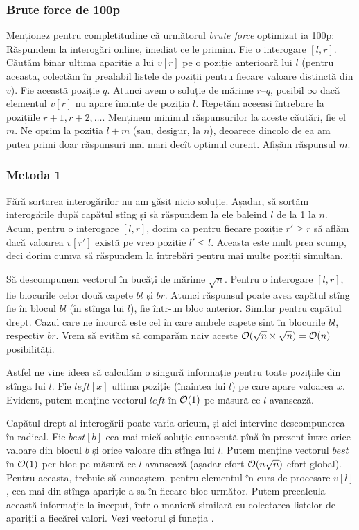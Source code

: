 \documentclass[../main.tex]{subfiles}
\begin{document}
\subsubsection*{Brute force de 100p}

Menționez pentru completitudine că următorul \textit{brute force} optimizat ia 100p: Răspundem la interogări online, imediat ce le primim. Fie o interogare $[l,r]$. Căutăm binar ultima apariție a lui $v[r]$ pe o poziție anterioară lui $l$ (pentru aceasta, colectăm în prealabil listele de poziții pentru fiecare valoare distinctă din $v$). Fie această poziție $q$. Atunci avem o soluție de mărime $r–q$, posibil $\infty$ dacă elementul $v[r]$ nu apare înainte de poziția $l$. Repetăm aceeași întrebare la pozițiile $r+1, r+2, \dots$. Menținem minimul răspunsurilor la aceste căutări, fie el $m$. Ne oprim la poziția $l+m$ (sau, desigur, la $n$), deoarece dincolo de ea am putea primi doar răspunsuri mai mari decît optimul curent. Afișăm răspunsul $m$.

\subsubsection*{Metoda 1}

Fără sortarea interogărilor nu am găsit nicio soluție. Așadar, să sortăm interogările după capătul stîng și să răspundem la ele baleind $l$ de la 1 la $n$. Acum, pentru o interogare $[l,r]$, dorim ca pentru fiecare poziție $r' \geq r$ să aflăm dacă valoarea $v[r']$ există pe vreo poziție $l' \leq l$. Aceasta este mult prea scump, deci dorim cumva să răspundem la întrebări pentru mai multe poziții simultan.

Să descompunem vectorul în bucăți de mărime $\sqrt{n}$. Pentru o interogare $[l,r]$, fie blocurile celor două capete $bl$ și $br$. Atunci răspunsul poate avea capătul stîng fie în blocul $bl$ (în stînga lui $l$), fie într-un bloc anterior. Similar pentru capătul drept. Cazul care ne încurcă este cel în care ambele capete sînt în blocurile $bl$, respectiv $br$. Vrem să evităm să comparăm naiv aceste $\mathcal{O}(\sqrt{n} \times \sqrt{n}) = \mathcal{O}(n)$ posibilități.

Astfel ne vine ideea să calculăm o singură informație pentru toate pozițiile din stînga lui $l$. Fie $left[x]$ ultima poziție (înaintea lui $l$) pe care apare valoarea $x$. Evident, putem menține vectorul $left$ în $\mathcal{O}(1)$ pe măsură ce $l$ avansează.

Capătul drept al interogării poate varia oricum, și aici intervine descompunerea în radical. Fie $best[b]$ cea mai mică soluție cunoscută pînă în prezent între orice valoare din blocul $b$ și orice valoare din stînga lui $l$. Putem menține vectorul $best$ în $\mathcal{O}(1)$ per bloc pe măsură ce $l$ avansează (așadar efort $\mathcal{O}(n \sqrt{n})$ efort global). Pentru aceasta, trebuie să cunoaștem, pentru elementul în curs de procesare $v[l]$, cea mai din stînga apariție a sa în fiecare bloc următor. Putem precalcula această informație la început, într-o manieră similară cu colectarea listelor de apariții a fiecărei valori. Vezi vectorul  și funcția .
\end{document}
